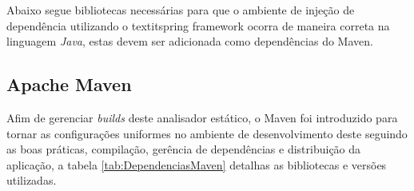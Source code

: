 Abaixo segue bibliotecas necessárias para que o ambiente de injeção de dependência utilizando o textit{spring framework} \cite{SPRING_REF} ocorra de maneira correta na linguagem \textit{Java}, estas devem ser adicionada como dependências do Maven.


\subsection{Apache Maven}
Afim de gerenciar \textit{builds} deste analisador estático, o Maven foi introduzido para tornar as configurações uniformes no ambiente de desenvolvimento deste seguindo as boas práticas, compilação, gerência de dependências e distribuição da aplicação, a tabela \ref{tab:DependenciasMaven} detalhas as bibliotecas e versões utilizadas.\\



